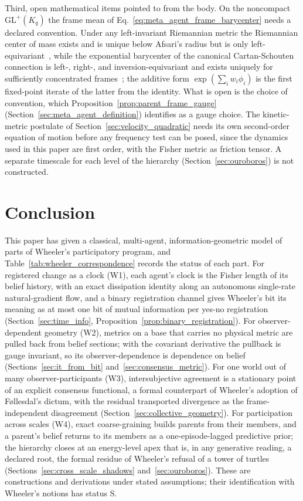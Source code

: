 Third, open mathematical items pointed to from the body. On the noncompact $\mathrm{GL}^+(K_q)$ the frame mean of Eq.~\eqref{eq:meta_agent_frame_barycenter} needs a declared convention. Under any left-invariant Riemannian metric the Riemannian center of mass exists and is unique below Afsari's radius but is only left-equivariant~\cite{Afsari2011}, while the exponential barycenter of the canonical Cartan-Schouten connection is left-, right-, and inversion-equivariant and exists uniquely for sufficiently concentrated frames~\cite{PennecArsigny2013}; the additive form $\exp(\sum_i w_i \phi_i)$ is the first fixed-point iterate of the latter from the identity. What is open is the choice of convention, which Proposition~\ref{prop:parent_frame_gauge} (Section~\ref{sec:meta_agent_definition}) identifies as a gauge choice. The kinetic-metric postulate of Section~\ref{sec:velocity_quadratic} needs its own second-order equation of motion before any frequency test can be posed, since the dynamics used in this paper are first order, with the Fisher metric as friction tensor. A separate timescale for each level of the hierarchy (Section~\ref{sec:ouroboros}) is not constructed.

\section{Conclusion}\label{sec:global_conclusion}

This paper has given a classical, multi-agent, information-geometric model of parts of Wheeler's participatory program, and Table~\ref{tab:wheeler_correspondence} records the status of each part. For registered change as a clock (W1), each agent's clock is the Fisher length of its belief history, with an exact dissipation identity along an autonomous single-rate natural-gradient flow, and a binary registration channel gives Wheeler's bit its meaning as at most one bit of mutual information per yes-no registration (Section~\ref{sec:time_info}, Proposition~\ref{prop:binary_registration}). For observer-dependent geometry (W2), metrics on a base that carries no physical metric are pulled back from belief sections; with the covariant derivative the pullback is gauge invariant, so its observer-dependence is dependence on belief (Sections~\ref{sec:it_from_bit} and~\ref{sec:consensus_metric}). For one world out of many observer-participants (W3), intersubjective agreement is a stationary point of an explicit consensus functional, a formal counterpart of Wheeler's adoption of F{\o}llesdal's dictum, with the residual transported divergence as the frame-independent disagreement (Section~\ref{sec:collective_geometry}). For participation across scales (W4), exact coarse-graining builds parents from their members, and a parent's belief returns to its members as a one-episode-lagged predictive prior; the hierarchy closes at an energy-level apex that is, in any generative reading, a declared root, the formal residue of Wheeler's refusal of a tower of turtles (Sections~\ref{sec:cross_scale_shadows} and~\ref{sec:ouroboros}). These are constructions and derivations under stated assumptions; their identification with Wheeler's notions has status S.

